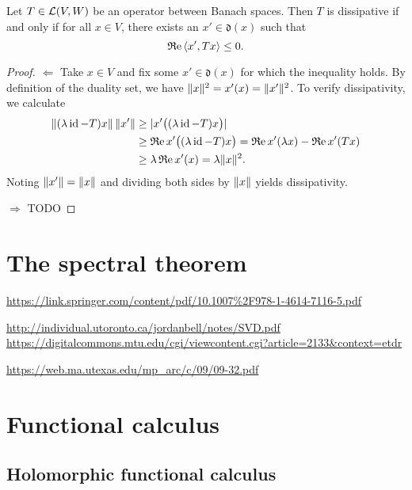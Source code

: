 \begin{proposition}
Let $T\in\operatorname{\mathcal{L}}(V,W)$ be an operator between Banach spaces. Then $T$ is dissipative \textup{if and only if} for all $x\in V$, there exists an $x'\in \mathfrak{d}(x)$ such that
\[ \operatorname{\mathfrak{R}e}\left\langle x', Tx \right\rangle \leq 0. \]
\end{proposition}
\begin{proof}
$\boxed{\Leftarrow}$ Take $x\in V$ and fix some $x'\in \mathfrak{d}(x)$ for which the inequality holds. By definition of the duality set, we have $\lVert x\rVert^2 = x'(x) = \lVert x'\rVert^2$. To verify dissipativity, we calculate
\begin{align*}
\lVert(\lambda\operatorname{id}-T)x\rVert\,\lVert x'\rVert &\geq |x'\big((\lambda\operatorname{id}-T)x\big)| \\
&\geq \operatorname{\mathfrak{R}e} x'\big((\lambda\operatorname{id}-T)x\big) = \operatorname{\mathfrak{R}e} x'(\lambda x) - \operatorname{\mathfrak{R}e} x'(Tx) \\
&\geq \lambda \operatorname{\mathfrak{R}e} x'(x) = \lambda \lVert x\rVert^2.
\end{align*}
Noting $\lVert x'\rVert = \lVert x\rVert$ and dividing both sides by $\lVert x\rVert$ yields dissipativity.

$\boxed{\Rightarrow}$ TODO
\end{proof}

\section{The spectral theorem}
\url{https://link.springer.com/content/pdf/10.1007%2F978-1-4614-7116-5.pdf}

\url{http://individual.utoronto.ca/jordanbell/notes/SVD.pdf}
\url{https://digitalcommons.mtu.edu/cgi/viewcontent.cgi?article=2133&context=etdr}

\url{https://web.ma.utexas.edu/mp_arc/c/09/09-32.pdf}


\section{Functional calculus}
\subsection{Holomorphic functional calculus}

